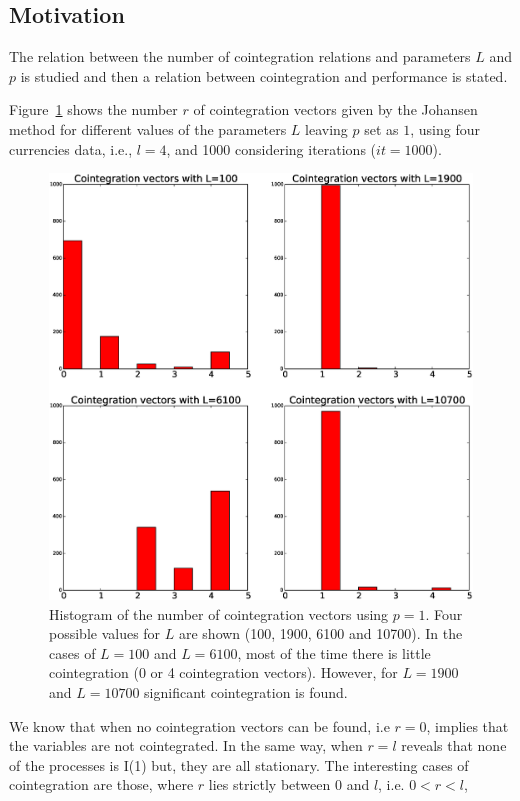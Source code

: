 \subsection{Motivation}
The relation between the number of cointegration relations
and parameters $L$ and $p$ is studied and then a relation between cointegration
and performance is stated.

Figure~\ref{fig:hists} shows the number $r$ of cointegration vectors given by
the Johansen method for different values of the parameters $L$ leaving $p$ set
as $1$, using four currencies data, i.e., $l=4$, and 1000 considering iterations
($it=1000$).
\begin{figure}[!h]
  \centering
  \includegraphics[width=\textwidth]{img/histCointVectors}
  \caption{Histogram of the number of cointegration vectors using $p=1$. Four
  possible values for $L$ are shown (100, 1900, 6100 and 10700).
  In the cases of $L=100$ and $L=6100$, most of the time there is little
  cointegration (0 or 4 cointegration vectors). However, for $L=1900$ and
  $L=10700$ significant cointegration is found.}
  \label{fig:hists}
\end{figure}
We know that when no cointegration vectors can be found, i.e $r=0$, implies that
the variables are not cointegrated. In the same way, when $r=l$ reveals that
none of the processes is I(1) but, they are all stationary.  The interesting cases of
cointegration are those, where $r$ lies strictly between $0$ and $l$, i.e.
$0<r<l$, 

